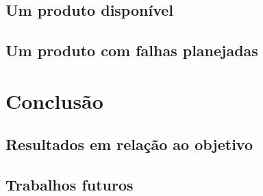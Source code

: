 \documentclass[]{../class/politex}
\begin{document}
    \section{Um produto disponível}

    \section{Um produto com falhas planejadas}

  \chapter{Conclusão}

    \section{Resultados em relação ao objetivo}

    \section{Trabalhos futuros}

  

  
\end{document}
